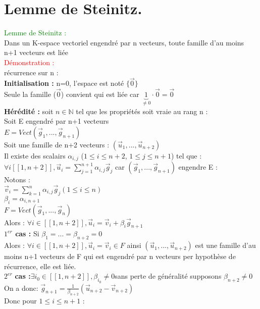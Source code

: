 \documentclass{article}
\begin{document}
\section{Lemme de Steinitz.}
\textcolor{green}{Lemme de Steinitz :} \\
Dans un K-espace vectoriel engendré par n vecteurs, toute famille d'au moins n+1 vecteurs est liée \\
\textcolor{red}{Démonstration :} \\
récurrence sur n : \\
{\bf Initialisation :}  n=0, l'espace est noté $ \lbrace  \vec 0 \rbrace $ \\
Seule la famille ($\vec 0$) convient qui est liée car $\underbrace{1}_{\neq 0}\cdot \vec 0= \vec 0$ \\
{\bf Hérédité : } soit $n \in \mathbb N$ tel que les propriétés soit vraie au rang n : \\
Soit E engendré par n+1 vecteurs \\
$E=Vect(\vec g_1,...,\vec g_{n+1})$ \\
Soit une famille de n+2 vecteurs : $(\vec u_1,...,\vec u_{n+2})$ \\
Il existe des scalairs $\alpha_{i,j}$ ($1 \leq i \leq n+2$, $1 \leq j \leq n+1$) tel que : \\
$\forall i [[1,n+2]], \vec u_i= \sum_{j=1}^{n+1} \alpha_{i,j} \vec g_j$ car $(\vec g_1,...,\vec g_{n+1})$ engendre E : \\
Notons : \\
$\vec v_i=\sum_{k=1}^n \alpha_{i,j} \vec g_j (1 \leq i \leq n)$ \\
$\beta_i=\alpha_{i,n+1}$ \\
$F=Vect(\vec g_1,...,\vec g_n)$ \\
Alors : $\forall i \in [[1,n+2]], \vec u_i=\vec v_i + \beta_i \vec g_{n+1}$ \\
{\boldmath \bf $1^{er}$ cas :} Si $\beta_1=...=\beta_{n+2}=0$ \\
Alors : $\forall i \in [[1,n+2]], \vec u_i=\vec v_i \in F$ ainsi $(\vec u_1,..., \vec u_{n+2})$ est une famille d'au moins n+1 vecteurs de F qui est engendré par n vecteurs per hypothèse de récurrence, elle est liée. \\
{\boldmath $2^{er}$ \bf cas :}$\exists i_0 \in [[1,n+2]], \beta_{i_0}\neq 0$sans perte de généralité supposons $\beta_{n+2}\neq 0$ \\
On a donc: $\vec g_{n+1}= \frac{1}{\beta_{n+2}}(\vec u_{n+2}-\vec v_{n+2})$ \\
Donc pour $1 \leq i \leq n+1$ : \\
\end{document}
